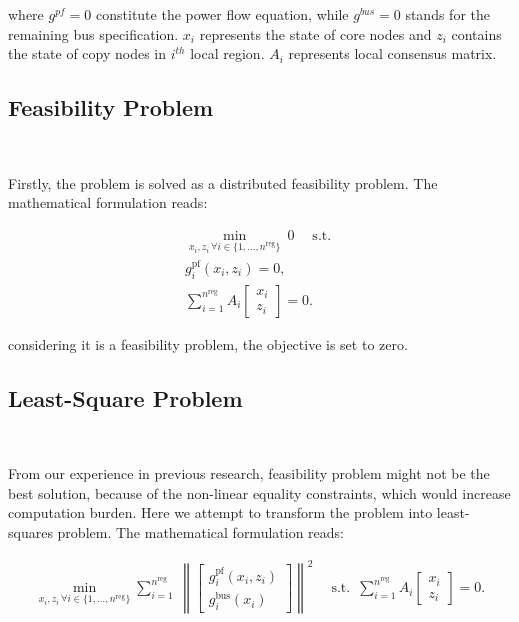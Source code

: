 \documentclass{article}
\newcommand{\n}{n}
\newcommand{\nregions}{\n^{\text{reg}}}
\newcommand{\stateCore}{x}
\newcommand{\stateCopy}{z}
\newcommand{\pf}{g^{\text{pf}}}
\newcommand{\busspecs}{g^{\text{bus}}}
\newcommand{\norm}[1]{\left\lVert#1\right\rVert}
\begin{document}
where $g^{pf}=0$ constitute the power flow equation, while $g^{bus}=0$ stands for the remaining bus specification. $x_i$ represents the state of core nodes and $z_i$ contains the state of copy nodes in $i^{th}$ local region. $A_i$ represents local consensus matrix.

\subsection{Feasibility Problem}~\label{sec: feasibility problem}

Firstly, the problem is solved as a distributed feasibility problem. The mathematical formulation reads:

    \begin{subequations}
        \label{eq:dist-feasibility-problem}
        \begin{align}
            \underset{\stateCore_i, \stateCopy_i \, \forall i \in  \{1, \dots, \nregions\}}{\operatorname{min}} \: 0 \quad \operatorname{s.t.}\\
            \pf_i( \stateCore_i, \stateCopy_i ) = 0,~\label{g_pf} \\
            \sum_{i = 1}^{\nregions} A_i \begin{bmatrix}
                \stateCore_i \\
                \stateCopy_i
            \end{bmatrix}= 0.
        \end{align}
    \end{subequations}

considering it is a feasibility problem, the objective is set to zero.

\subsection{Least-Square Problem}~\label{sec: least-squares problem formlulation}

From our experience in previous research, feasibility problem might not be the best solution, because of the non-linear equality constraints, which would increase computation burden. Here we attempt to transform the problem into least-squares problem. The mathematical formulation reads:

    \begin{subequations}
        \label{eq:dist-least-squares-problem}
        \begin{align}
            \underset{\stateCore_i, \stateCopy_i \, \forall i \in  \{1, \dots, \nregions\}}{\operatorname{min}} \sum_{i = 1}^{\nregions}  \: \norm{\begin{bmatrix}
                \pf_i( \stateCore_i, \stateCopy_i ) \\
                \busspecs_i ( \stateCore_i )
            \end{bmatrix}}^2 \quad \operatorname{s.t.} ~ \sum_{i = 1}^{\nregions} A_i \begin{bmatrix}
                \stateCore_i \\
                \stateCopy_i
            \end{bmatrix}
            = 0.
        \end{align}
    \end{subequations}
\end{document}
